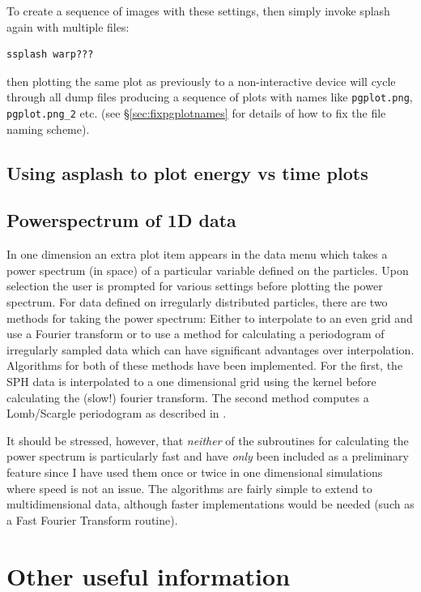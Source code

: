 \documentclass[a4paper,11pt]{article}
\begin{document}
  To create a sequence of images with these settings, then simply invoke splash again with multiple files:
\begin{verbatim}
ssplash warp???
\end{verbatim}
then plotting the same plot as previously to a non-interactive device will cycle through all dump files producing a sequence of plots with names like \verb+pgplot.png+, \verb+pgplot.png_2+ etc. (see \S\ref{sec:fixpgplotnames} for details of how to fix the file naming scheme).

\subsection{Using asplash to plot energy vs time plots}

\subsection{Powerspectrum of 1D data}
 In one dimension an extra plot item appears
in the data menu which takes a power spectrum (in space) of a particular
variable defined on the particles. Upon selection the user is prompted for
various settings before plotting the power spectrum. For data defined on
irregularly distributed particles, there are two methods for taking the power
spectrum: Either to interpolate to an even grid and use a Fourier
transform or to use a method for calculating a periodogram of
irregularly sampled data which can have significant advantages over
interpolation. Algorithms for both of these methods have been
implemented. For the first, the SPH data is interpolated to a one dimensional
grid using the kernel before calculating the (slow!) fourier
transform. The second method computes a Lomb/Scargle periodogram as described in \citet{numericalrecipes}. 

 It should be stressed, however, that \emph{neither} of the subroutines for
calculating the power spectrum is particularly fast and have \emph{only} been included as a preliminary feature since I have used them once or twice in one dimensional simulations where speed is not an issue. The algorithms are fairly simple to extend to multidimensional
data, although faster implementations would be needed (such as a Fast
Fourier Transform routine).


\section{Other useful information}
\end{document}
